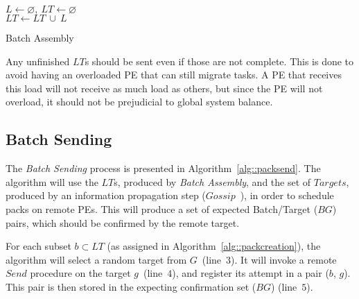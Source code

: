 
\begin{algorithm}[!ht]
    \DontPrintSemicolon
    $L \gets \varnothing,\ LT \gets \varnothing$ \\
    $LT \gets LT\ \cup\ L$   
    \caption{Batch Assembly} 
    \label{alg::packcreation}
\end{algorithm}

Any unfinished $LT$s should be sent even if those are not complete.
This is done to avoid having an overloaded PE that can still migrate tasks.
A PE that receives this load will not receive as much load as others, but since the PE will not overload, it should not be prejudicial to global system balance.

\subsection{Batch Sending} \label{sec:algo:sending}

The \textit{Batch Sending} process is presented in Algorithm~\ref{alg::packsend}.
The algorithm will use the $LT$s, produced by \textit{Batch Assembly}, and the set of $Targets$, produced by an information propagation step ($Gossip$~\cite{gossip}), in order to schedule packs on remote PEs.
This will produce a set of expected Batch/Target ($BG$) pairs, which should be confirmed by the remote target.

For each subset $b \subset LT$ (as assigned in Algorithm~\ref{alg::packcreation}), the algorithm will select a random target from $G$~(line~$3$).
It will invoke a remote $Send$ procedure on the target $g$~(line~$4$), and register its attempt in a pair ($b$, $g$).
This pair is then stored in the expecting confirmation set ($BG$) (line~$5$).


